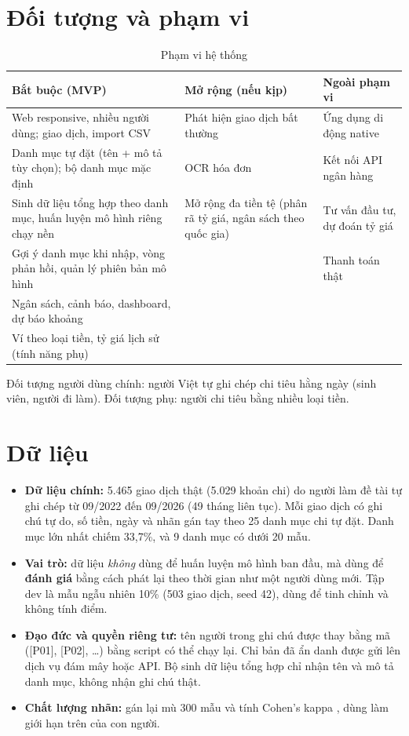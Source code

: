 \documentclass[12pt,a4paper]{article}
\begin{document}
\section{Đối tượng và phạm vi}

\begin{table}[H]
\centering\small
\caption{Phạm vi hệ thống}
\begin{tabularx}{\linewidth}{L L L}
\toprule
Bắt buộc (MVP) & Mở rộng (nếu kịp) & Ngoài phạm vi \\
\midrule
Web responsive, nhiều người dùng; giao dịch, import CSV & Phát hiện giao dịch bất thường & Ứng dụng di động native \\
Danh mục tự đặt (tên + mô tả tùy chọn); bộ danh mục mặc định & OCR hóa đơn & Kết nối API ngân hàng \\
Sinh dữ liệu tổng hợp theo danh mục, huấn luyện mô hình riêng chạy nền & Mở rộng đa tiền tệ (phân rã tỷ giá, ngân sách theo quốc gia) & Tư vấn đầu tư, dự đoán tỷ giá \\
Gợi ý danh mục khi nhập, vòng phản hồi, quản lý phiên bản mô hình & & Thanh toán thật \\
Ngân sách, cảnh báo, dashboard, dự báo khoảng & & \\
Ví theo loại tiền, tỷ giá lịch sử (tính năng phụ) & & \\
\bottomrule
\end{tabularx}
\end{table}

Đối tượng người dùng chính: người Việt tự ghi chép chi tiêu hằng ngày (sinh viên, người đi làm). Đối tượng phụ: người chi tiêu bằng nhiều loại tiền.

\section{Dữ liệu}

\begin{itemize}
  \item \textbf{Dữ liệu chính:} 5.465 giao dịch thật (5.029 khoản chi) do người làm đề tài tự ghi chép từ 09/2022 đến 09/2026 (49 tháng liên tục). Mỗi giao dịch có ghi chú tự do, số tiền, ngày và nhãn gán tay theo 25 danh mục chi tự đặt. Danh mục lớn nhất chiếm 33,7\%, và 9 danh mục có dưới 20 mẫu.
  \item \textbf{Vai trò:} dữ liệu \emph{không} dùng để huấn luyện mô hình ban đầu, mà dùng để \textbf{đánh giá} bằng cách phát lại theo thời gian như một người dùng mới. Tập dev là mẫu ngẫu nhiên 10\% (503 giao dịch, seed 42), dùng để tinh chỉnh và không tính điểm.
  \item \textbf{Đạo đức và quyền riêng tư:} tên người trong ghi chú được thay bằng mã ([P01], [P02], \ldots) bằng script có thể chạy lại. Chỉ bản đã ẩn danh được gửi lên dịch vụ đám mây hoặc API. Bộ sinh dữ liệu tổng hợp chỉ nhận tên và mô tả danh mục, không nhận ghi chú thật.
  \item \textbf{Chất lượng nhãn:} gán lại mù 300 mẫu và tính Cohen's kappa \citep{cohen1960kappa}, dùng làm giới hạn trên của con người.
\end{itemize}
\end{document}
